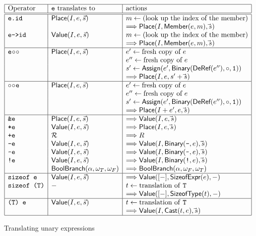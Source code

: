 \begin{docpart}
\begin{figure}\begin{displaymath}\begin{array}{|l|l|l|}
\hline
\mbox{Operator} & \mbox{\syntax{e} translates to} & \mbox{actions} \\
\hline
\hline
\syntax{e.id} & \cons{Place}(I,e,\vec s) &
   m <- \mbox{(look up the index of the member)} \\
&& ==> \cons{Place}(I,\cons{Member}(e,m),\vec s) \\
\syntax{e->id} & \cons{Value}(I,e,\vec s) &
   m <- \mbox{(look up the index of the member)} \\
&& ==> \cons{Place}(I,\cons{Member}(e,m),\vec s) \\
\hline
\syntax{e}\!\circ\!\circ & \cons{Place}(I,e,\vec s) &
   e' <- \mbox{fresh copy of }e \\
&& e'' <- \mbox{fresh copy of }e \\
&& s' <- \cons{Assign}(e',\cons{Binary}(\cons{DeRef}(e''),\circ,\syntax{1})) \\
&& ==> \cons{Place}(I,e,s' + \vec s) \\
\hline
\circ\!\circ\!\syntax{e} & \cons{Place}(I,e,\vec s) &
   e' <- \mbox{fresh copy of }e \\
&& e'' <- \mbox{fresh copy of }e \\
&& s' <- \cons{Assign}(e',\cons{Binary}(\cons{DeRef}(e''),\circ,\syntax{1})) \\
&& ==> \cons{Place}(I+e',e,\vec s) \\
\hline
\syntax{\&e} & \cons{Place}(I,e,\vec s) &
   ==> \cons{Value}(I,e,\vec s) \\
\syntax{*e} & \cons{Value}(I,e,\vec s) &
   ==> \cons{Place}(I,e,\vec s) \\
\syntax{+e} & {\mathcal R} &
   ==> {\mathcal R} \\
\syntax{-e} & \cons{Value}(I,e,\vec s) &
   ==> \cons{Value}(I,\cons{Binary}(\syntax{-},e),\vec s) \\
\syntax{\char`\~e} & \cons{Value}(I,e,\vec s) &
   ==> \cons{Value}(I,\cons{Binary}(\syntax{\char`\~},e),\vec s) \\
\syntax{!e} & \cons{Value}(I,e,\vec s) &
   ==> \cons{Value}(I,\cons{Binary}(\syntax{!},e),\vec s) \\
& \cons{BoolBranch}(\alpha,\omega_T,\omega_F) &
   ==> \cons{BoolBranch}(\alpha,\omega_F,\omega_T) \\
\hline
\syntax{sizeof e} & \cons{Value}(I,e,\vec s) &
   ==> \cons{Value}([-],\cons{SizeofExpr}(e),-) \\
\syntax{sizeof (T)} & - &
   t <- \mbox{translation of \syntax{T}} \\
&& ==> \cons{Value}([-],\cons{SizeofType}(t),-) \\
\hline
\syntax{(T) e} & \cons{Value}(I,e,\vec s) &
   t <- \mbox{translation of \syntax{T}} \\
&& ==> \cons{Value}(I,\cons{Cast}(t,e),\vec s) \\
\hline
\end{array}\end{displaymath}
\caption{Translating unary expressions}
\label{fig:c2coreUnary}
\end{figure}


\end{docpart}
